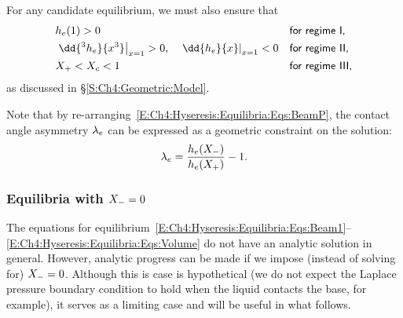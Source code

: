 For any candidate equilibrium, we must also ensure that
\begin{align}
&h_e(1) > 0 & &\textsf{for regime I,}\label{E:Ch4:Hyseresis:Equilibria:Eqs:regimeI_constraint}\\
&\left.\dd{^3 h_e}{x^3}\right|_{x = 1} >0, \quad \left.\dd{h_e}{x}\right|_{x =1} <0 & &\textsf{for regime II,}\label{E:Ch4:Hyseresis:Equilibria:Eqs:regimeII_constraint}\\
&\xrighteq < \xceq < 1 & &\textsf{for regime III,}\label{E:Ch4:Hyseresis:Equilibria:Eqs:regimeIII_constraint}
\end{align}
as discussed in \S\ref{S:Ch4:Geometric:Model}.

Note that by re-arranging~\eqref{E:Ch4:Hyseresis:Equilibria:Eqs:BeamP}, the contact angle asymmetry $\lambda_e$ can be expressed as a geometric constraint on the solution:
\begin{equation}\label{E:Ch4:Hyseresis:Equilibria:Eqs:hyspar_geometry}
\lambda_e = \frac{h_e(X_{-})}{h_e(X_{+})} - 1.
\end{equation}

\subsubsection{Equilibria with $X_{-} = 0$}
The equations for equilibrium~\eqref{E:Ch4:Hyseresis:Equilibria:Eqs:Beam1}--\eqref{E:Ch4:Hyseresis:Equilibria:Eqs:Volume} do not have an analytic solution in general. However, analytic progress can be made if we impose (instead of solving for) $X_{-} = 0$. Although this is case is hypothetical (we do not expect the Laplace pressure boundary condition to hold when the liquid contacts the base, for example), it serves as a limiting case and will be useful in what follows.

